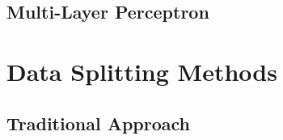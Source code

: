         \subsection{Multi-Layer Perceptron}

    \section{Data Splitting Methods}

        \subsection{Traditional Approach} \label{sec:badsplit}
    
                
                


